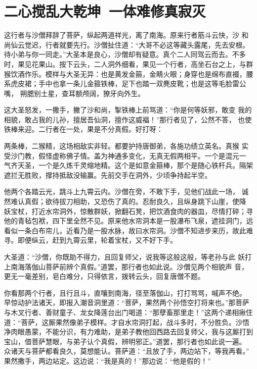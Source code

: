 \chapter{二心搅乱大乾坤~一体难修真寂灭}

这行者与沙僧拜辞了菩萨，纵起两道祥光，离了南海。原来行者筋斗云快，沙
和尚仙云觉迟，行者就要先行。沙僧扯住道：“大哥不必这等藏头露尾，先去安根。
待小弟与你一同走。”大圣本是良心，沙僧却有疑意。真个二人同驾云而去。不多
时，果见花果山。按下云头，二人洞外细看，果见一个行者，高坐石台之上，与群
猴饮酒作乐。模样与大圣无异：也是黄发金箍，金睛火眼；身穿也是绵布直裰，腰
系虎皮裙；手中也拿一条儿金箍铁棒，足下也踏一双麂皮靴；也是这等毛脸雷公嘴，
朔腮别土星，查耳额颅阔，獠牙向外生。

这大圣怒发，一撒手，撇了沙和尚，掣铁棒上前骂道：“你是何等妖邪，敢变
我的相貌，敢占我的儿孙，擅居吾仙洞，擅作这威福！”那行者见了，公然不答，
也使铁棒来迎。二行者在一处，果是不分真假。好打呀：

两条棒，二猴精，这场相敌实非轻。都要护持唐御弟，各施功绩立英名。真猴
实受沙门教，假怪虚称佛子情。盖为神通多变化，无真无假两相平。一个是混元一
气齐天圣，一个是久炼千灵缩地精。这个是如意金箍棒，那个是随心铁杆兵。隔架
遮拦无胜败，撑持抵敌没输赢。先前交手在洞外，少顷争持起半空。

他两个各踏云光，跳斗上九霄云内。沙僧在旁，不敢下手，见他们战此一场，
诚然难认真假；欲待拔刀相助，又恐伤了真的。忍耐良久，且纵身跳下山崖，使降
妖宝杖，打近水帘洞外，惊散群妖，掀翻石凳，把饮酒食肉的器皿，尽情打碎；寻
他的青毡包袱，四下里全然不见。原来他水帘洞本是一股瀑布飞泉，遮挂洞门，远
看似一条白布帘儿，近看乃是一股水脉，故曰水帘洞。沙僧不知进步来历，故此难
寻。即便纵云，赶到九霄云里，轮着宝杖，又不好下手。

大圣道：“沙僧，你既助不得力，且回复师父，说我等这般这般，等老孙与此
妖打上南海落伽山菩萨前辨个真假。”道罢，那行者也如此说。沙僧见两个相貌声
音，更无一毫差别，皂白难分，只得依言，拨转云头，回复唐僧不题。

你看那两个行者，且行且斗，直嚷到南海，径至落伽山，打打骂骂，喊声不绝。
早惊动护法诸天，即报入潮音洞里道：“菩萨，果然两个孙悟空打将来也。”那菩萨
与木叉行者、善财童子、龙女降莲台出门喝道：“那孽畜那里走！”这两个递相揪住
道：“菩萨，这厮果然像弟子模样。才自水帘洞打起，战斗多时，不分胜负。沙悟
净肉眼愚蒙，不能分识，有力难助，是弟子教他回西路去回复师父，我与这厮打到
宝山，借菩萨慧眼，与弟子认个真假，辨明邪正。”道罢，那行者也如此说一遍。
众诸天与菩萨都看良久，莫想能认。菩萨道：“且放了手，两边站下，等我再看。”
果然撒手，两边站定。这边说：“我是真的！”那边说：“他是假的！”

